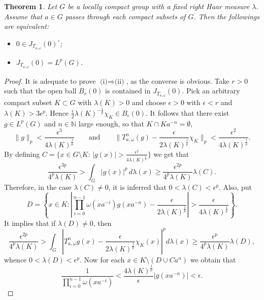 \documentclass{amsart}
\newtheorem{thm}{Theorem}[section]
\theoremstyle{definition}\newtheorem{defn}[thm]{Definition}
\theoremstyle{remark}
\numberwithin{equation}{section}
\begin{document}
\begin{thm}
Let $G$ be a locally compact group with a fixed right Haar measure
$\lambda$. Assume that $a\in G$ passes through each compact subsets
of $G$. Then the followings are equivalent:
\begin{itemize}
\item[(i)] $0\in J_{T_{a,\omega}}(0)^\circ$;\\
\item[(ii)] $J_{T_{a,\omega}}(0)=L^p(G)$.
\end{itemize}
\end{thm}
\begin{proof}
It is adequate to prove $\mbox{(i)}\Rightarrow\mbox{(ii)}$, as the
converse is obvious. Take $r>0$ such that the open ball $B_{r}(0)$
is contained in $J_{T_{a,\omega}}(0)$. Pick an arbitrary compact
subset $K\subset G$ with $\lambda(K)>0$ and choose $\epsilon>0$ with
$\epsilon<r$ and $\lambda(K)>3\epsilon^p$. Hence
$\displaystyle\frac{\epsilon}{2}\lambda(K)^{-\frac{1}{p}}\chi_{K}\in
B_{\epsilon}(0)$. It follows that there exist $g\in L^p(G)$ and
$n\in\mathbb{N}$ large enough, so that $K\cap Ka^{-n}=\emptyset$,
$$
\|g\|_p<\frac{\epsilon^3}{4\lambda(K)^\frac{1}{p}} \qquad \mbox{and}
\qquad
\|T_{a,\omega}^n(g)-\frac{\epsilon}{2\lambda(K)^\frac{1}{p}}\chi_{K}\|_p<
\frac{\epsilon^2}{4\lambda(K)^\frac{1}{p}}.
$$
By defining $C=\{x\in G\setminus
K:\,|g(x)|>\frac{\epsilon^2}{4\lambda(K)^\frac{1}{p}}\}$ we get that
$$
\frac{\epsilon^{3p}}{4^p\lambda(K)}>\int_G|g(x)|^p\,d\lambda(x)\geq
\frac{\epsilon^{2p}}{4^p\lambda(K)}\lambda(C).
$$
Therefore, in the case $\lambda(C)\neq 0$, it is inferred that
$0<\lambda(C)<\epsilon^p$. Also, put
$$
D=\left\{x\in K:\left|\prod_{i=0}^{n-1}
\omega(xa^{-i})g(xa^{-n})-\frac{\epsilon}{2\lambda(K)^{\frac{1}{p}}}\right|>
\frac{\epsilon}{4\lambda(K)^{\frac{1}{p}}}\right\}.
$$
It implies that if $\lambda(D)\neq 0$, then
$$
\frac{\epsilon^{2p}}{4^p\lambda(K)}>
\int_G|T_{a,\omega}^{n}g(x)-\frac{\epsilon}{2\lambda(K)^\frac{1}{p}}\chi_{K}(x)|^p
d\lambda(x)\geq \frac{\epsilon^{p}}{4^p\lambda(K)}\lambda(D),
$$
whence $0<\lambda(D)<\epsilon^p$. Now for each $x\in
K\setminus(D\cup Ca^{n})$ we obtain that
$$
\frac{1}{\prod_{i=0}^{n-1}\omega(xa^{-i})}<\frac{4\lambda(K)^{\frac{1}{p}}}
{\epsilon}|g(xa^{-n})|<\epsilon.
$$
\end{proof}
\end{document}
